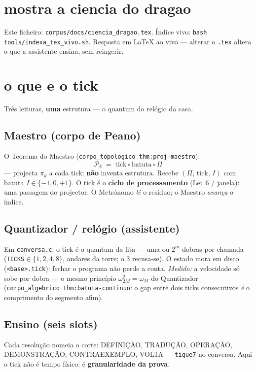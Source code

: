 \documentclass[11pt,a4paper]{article}
\newcommand{\code}[1]{\texttt{\small #1}}
\begin{document}
\section{mostra a ciencia do dragao}
Este ficheiro: \code{corpus/docs/ciencia\_dragao.tex}. Índice vivo:
\code{bash tools/indexa\_tex\_vivo.sh}. Resposta em LaTeX ao vivo ---
alterar o \texttt{.tex} altera o que a assistente ensina, sem reingerir.

\section{o que e o tick}\label{sec:tick-teoria}
Três leituras, \textbf{uma} estrutura --- o quantum do relógio da casa.

\subsection*{Maestro (corpo de Peano)}
O Teorema do Maestro (\code{corpo\_topologico thm:proj-maestro}):
\[
\boxed{\;\mathcal{P}_k \;=\; \mathrm{tick}\circ\mathrm{batuta}\circ\Pi\;}
\]
--- projecta $\pi_k$ a cada tick; \textbf{não} inventa estrutura.
Recebe $(\Pi,\,\mathrm{tick},\,I)$ com batuta $I\in\{-1,0,+1\}$.
O tick é o \textbf{ciclo de processamento} (Lei~6 / janela): uma
passagem do projector. O Metrónomo \emph{lê} o resíduo; o Maestro
\emph{avança} o índice.

\subsection*{Quantizador / relógio (assistente)}
Em \code{conversa.c}: o tick é o quantum da fita --- uma ou $2^{m}$
dobras por chamada (\texttt{TICKS}$\in\{1,2,4,8\}$, andares da torre;
o $3$ recusa-se). O estado mora em disco (\texttt{<base>.tick}): fechar
o programa não perde a conta. \emph{Medido:} a velocidade só sobe por
dobra --- o mesmo princípio $\omega_{2M}^{2}=\omega_M$ do Quantizador
(\code{corpo\_algebrico thm:batuta-continuo}: o gap entre dois ticks
consecutivos \emph{é} o comprimento do segmento afim).

\subsection*{Ensino (seis slots)}
Cada resolução nomeia o corte: DEFINIÇÃO, TRADUÇÃO, OPERAÇÃO,
DEMONSTRAÇÃO, CONTRAEXEMPLO, VOLTA --- \texttt{tique7} no conversa.
Aqui o tick não é tempo físico: é \textbf{granularidade da prova}.
\end{document}
